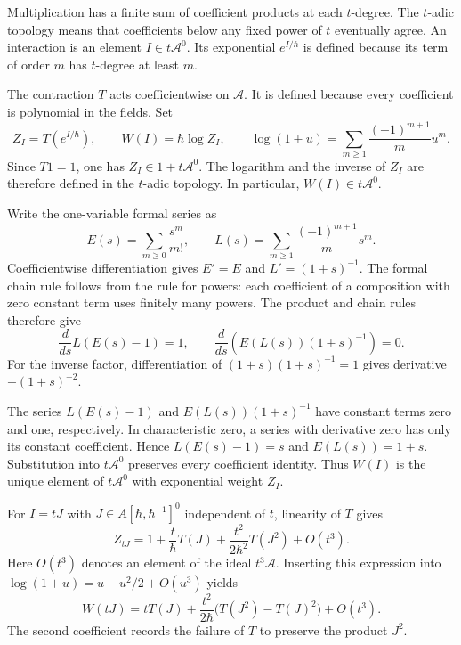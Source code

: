 Multiplication has a finite sum of coefficient products at each $t$-degree.
The $t$-adic topology means that coefficients below any fixed power of
$t$ eventually agree.
An interaction is an element $I\in t\mathcal A^0$.
Its exponential $e^{I/\hbar}$ is defined because its term of order $m$
has $t$-degree at least $m$.

The contraction $T$ acts coefficientwise on $\mathcal A$.
It is defined because every coefficient is polynomial in the fields.
Set
\begin{equation}\label{eq:gaussian-effective-action}
 Z_I=T(e^{I/\hbar}),\qquad
 W(I)=\hbar\log Z_I,
 \qquad
 \log(1+u)=\sum_{m\geq1}\frac{(-1)^{m+1}}{m}u^m.
\end{equation}
Since $T1=1$, one has $Z_I\in1+t\mathcal A^0$.
The logarithm and the inverse of $Z_I$ are therefore defined in the
$t$-adic topology. In particular, $W(I)\in t\mathcal A^0$.

Write the one-variable formal series as
\[
 E(s)=\sum_{m\geq0}\frac{s^m}{m!},\qquad
 L(s)=\sum_{m\geq1}\frac{(-1)^{m+1}}m s^m.
\]
Coefficientwise differentiation gives $E'=E$ and $L'=(1+s)^{-1}$.
The formal chain rule follows from the rule for powers: each coefficient
of a composition with zero constant term uses finitely many powers.
The product and chain rules therefore give
\[
 \frac{d}{ds}L(E(s)-1)=1,\qquad
 \frac{d}{ds}\left(E(L(s))(1+s)^{-1}\right)=0.
\]
For the inverse factor, differentiation of
$(1+s)(1+s)^{-1}=1$ gives derivative $-(1+s)^{-2}$.

The series $L(E(s)-1)$ and $E(L(s))(1+s)^{-1}$ have constant terms
zero and one, respectively. In characteristic zero, a series with derivative zero
has only its constant coefficient.
Hence $L(E(s)-1)=s$ and $E(L(s))=1+s$.
Substitution into $t\mathcal A^0$ preserves every coefficient identity.
Thus $W(I)$ is the unique element of $t\mathcal A^0$ with exponential
weight $Z_I$.

For $I=tJ$ with $J\in A[\hbar,\hbar^{-1}]^0$ independent of $t$,
linearity of $T$ gives
\[
 Z_{tJ}=1+\frac{t}{\hbar}T(J)
          +\frac{t^2}{2\hbar^2}T(J^2)+O(t^3).
\]
Here $O(t^3)$ denotes an element of the ideal $t^3\mathcal A$.
Inserting this expression into $\log(1+u)=u-u^2/2+O(u^3)$ yields
\begin{equation}\label{eq:gaussian-second-connected}
 W(tJ)=tT(J)+\frac{t^2}{2\hbar}
                   \bigl(T(J^2)-T(J)^2\bigr)+O(t^3).
\end{equation}
The second coefficient records the failure of $T$ to preserve the
product $J^2$.


